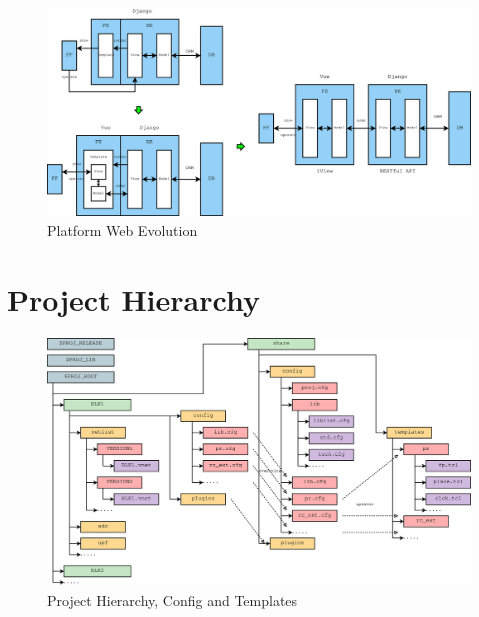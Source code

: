 \documentclass{beamer}
\begin{document}
\begin{frame}
  \begin{figure}
    \centering
    \includegraphics[width=1.05\linewidth]{web_evo}
    \caption{Platform Web Evolution}
  \end{figure}
\end{frame}

\section{Project Hierarchy} %

\begin{frame}
  \begin{figure}
    \centering
    \includegraphics[width=1.05\linewidth]{proj_hier}
    \caption{Project Hierarchy, Config and Templates}
  \end{figure}
\end{frame}
\end{document}
